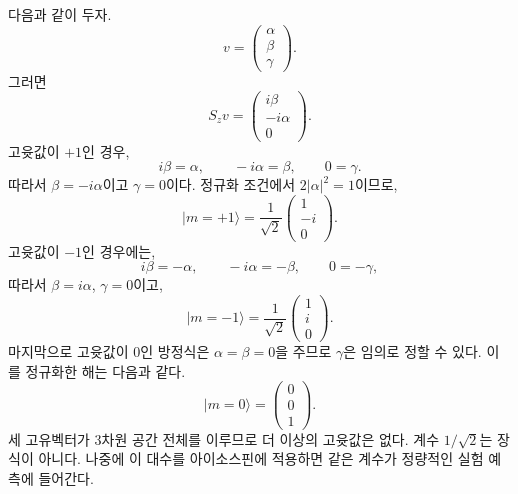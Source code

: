 다음과 같이 두자.
\begin{equation}
v=
\begin{pmatrix}
\alpha\\
\beta\\
\gamma
\end{pmatrix}.
\end{equation}
그러면
\begin{equation}
S_zv
=
\begin{pmatrix}
i\beta\\
-i\alpha\\
0
\end{pmatrix}.
\end{equation}
고윳값이 \(+1\)인 경우,
\begin{equation}
i\beta=\alpha,
\qquad
-i\alpha=\beta,
\qquad
0=\gamma.
\end{equation}
따라서 \(\beta=-i\alpha\)이고 \(\gamma=0\)이다. 정규화 조건에서 \(2|\alpha|^2=1\)이므로,
\begin{equation}
|m=+1\rangle
=
\frac{1}{\sqrt2}
\begin{pmatrix}
1\\
-i\\
0
\end{pmatrix}.
\end{equation}
고윳값이 \(-1\)인 경우에는,
\begin{equation}
i\beta=-\alpha,
\qquad
-i\alpha=-\beta,
\qquad
0=-\gamma,
\end{equation}
따라서 \(\beta=i\alpha\), \(\gamma=0\)이고,
\begin{equation}
|m=-1\rangle
=
\frac{1}{\sqrt2}
\begin{pmatrix}
1\\
i\\
0
\end{pmatrix}.
\end{equation}
마지막으로 고윳값이 0인 방정식은 \(\alpha=\beta=0\)을 주므로 \(\gamma\)은 임의로 정할 수 있다. 이를 정규화한 해는 다음과 같다.
\begin{equation}
|m=0\rangle
=
\begin{pmatrix}
0\\
0\\
1
\end{pmatrix}.
\end{equation}
세 고유벡터가 3차원 공간 전체를 이루므로 더 이상의 고윳값은 없다. 계수 \(1/\sqrt2\)는 장식이 아니다. 나중에 이 대수를 아이소스핀에 적용하면 같은 계수가 정량적인 실험 예측에 들어간다.

\begin{classroomqa}
\end{classroomqa}

